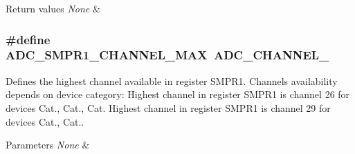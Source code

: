 \begin{DoxyRetVals}{Return values}
{\em None} & \\
\hline
\end{DoxyRetVals}
\hypertarget{group___a_d_c_ex___private___macro_ga69676d151f6b7ebf3ada32907f78fe00}{
\subsubsection[{A\-D\-C\-\_\-\-S\-M\-P\-R1\-\_\-\-C\-H\-A\-N\-N\-E\-L\-\_\-\-M\-A\-X}]{\setlength{\rightskip}{0pt plus 5cm}\#define A\-D\-C\-\_\-\-S\-M\-P\-R1\-\_\-\-C\-H\-A\-N\-N\-E\-L\-\_\-\-M\-A\-X~A\-D\-C\-\_\-\-C\-H\-A\-N\-N\-E\-L\-\_}}\label{group___a_d_c_ex___private___macro_ga69676d151f6b7ebf3ada32907f78fe00}


Defines the highest channel available in register S\-M\-P\-R1. Channels availability depends on device category\-: Highest channel in register S\-M\-P\-R1 is channel 26 for devices Cat., Cat., Cat. Highest channel in register S\-M\-P\-R1 is channel 29 for devices Cat., Cat.. 


\begin{DoxyParams}{Parameters}
{\em None} & \\
\hline
\end{DoxyParams}

